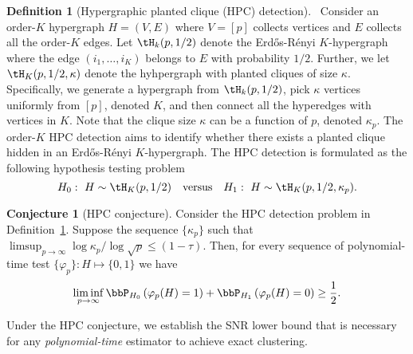 \documentclass[lettersize,onecolumn,journal]{IEEEtran}
\theoremstyle{definition}
\theoremstyle{definition}
\newtheorem{defn}{Definition}
\newtheorem{conjecture}{Conjecture}
\newcommand{\of}[1]{\left(#1\right)}
\begin{document}
\begin{defn}[Hypergraphic planted clique (HPC) detection]~\label{def:HPC} Consider an order-$K$ hypergraph $H = (V,E)$ where $V = [p]$ collects vertices and $E$ collects all the order-$K$ edges. Let $\tH_k(p, 1/2)$ denote the Erd\H{o}s-R\'{e}nyi $K$-hypergraph where the edge $(i_1,\ldots, i_K)$ belongs to $E$ with probability $1/2$. Further, we let $\tH_K(p, 1/2, \kappa)$ denote the hyhpergraph with planted cliques of size $\kappa$. Specifically, we generate a hypergraph from $\tH_k(p, 1/2)$, pick $\kappa$ vertices uniformly from $[p]$, denoted $K$, and then connect all the hyperedges with vertices in $K$. Note that the clique size $\kappa$ can be a function of $p$, denoted $\kappa_p$. The order-$K$ HPC detection aims to identify whether there exists a planted clique hidden in an Erd\H{o}s-R\'{e}nyi $K$-hypergraph. The HPC detection is formulated as the following hypothesis testing problem
\begin{equation}
    H_0:\ H \sim \tH_K(p,1/2) \quad \text{versus} \quad H_1: \ H \sim \tH_K(p,1/2, \kappa_p).
\end{equation}
\end{defn}

\begin{conjecture}[HPC conjecture]\label{hypo:HPC} Consider the HPC detection problem in Definition~\ref{def:HPC}. Suppose the sequence $\{\kappa_p\}$ such that $\limsup_{p \rightarrow \infty} \log \kappa_p/ \log \sqrt{p} \leq (1 - \tau)$. Then, for every sequence of polynomial-time test $\{ \varphi_p\}: H \mapsto \{0,1\}$ we have 
\begin{equation}
    \liminf_{p \rightarrow \infty} \bbP_{H_0} \of{ \varphi_p(H) =1 } +  \bbP_{H_1} \of{ \varphi_p(H) =0} \geq \frac{1}{2}.
\end{equation}
\end{conjecture}

Under the HPC conjecture, we establish the SNR lower bound that is necessary for any \emph{polynomial-time} estimator to achieve exact clustering.
\end{document}
